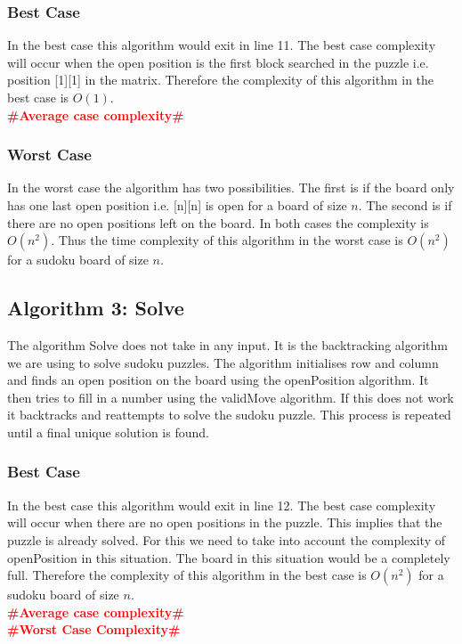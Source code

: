 \documentclass[12pt,a4paper,titlepage]{article}
\newcommand{\todo}[1]{\textcolor{red}{\textbf{\##1\#}}}
\begin{document}
\subsubsection{Best Case}

In the best case this algorithm would exit in line 11. The best case complexity will occur when the open position is the first block searched in the puzzle i.e. position [1][1] in the matrix. Therefore the complexity of this algorithm in the best case is $O(1)$.
\\
\todo{Average case complexity}
\\

\subsubsection{Worst Case}

In the worst case the algorithm has two possibilities. The first is if the board only has one last open position i.e. [n][n] is open for a board of size $n$. The second is if there are no open positions left on the board. In both cases the complexity is $O(n^{2})$. Thus the time complexity of this algorithm in the worst case is $O(n^{2})$ for a sudoku board of size $n$.

\subsection{Algorithm 3: Solve}

The algorithm Solve does not take in any input. It is the backtracking algorithm we are using to solve sudoku puzzles. The algorithm initialises row and column and finds an open position on the board using the openPosition algorithm. It then tries to fill in a number using the validMove algorithm. If this does not work it backtracks and reattempts to solve the sudoku puzzle. This process is repeated until a final unique solution is found.

\subsubsection{Best Case}

In the best case this algorithm would exit in line 12. The best case complexity will occur when there are no open positions in the puzzle. This implies that the puzzle is already solved. For this we need to take into account the complexity of openPosition in this situation. The board in this situation would be a completely full. Therefore the complexity of this algorithm in the best case is $O(n^{2})$ for a sudoku board of size $n$.
\\
\todo{Average case complexity}
\\
\todo{Worst Case Complexity}
\\
\end{document}
